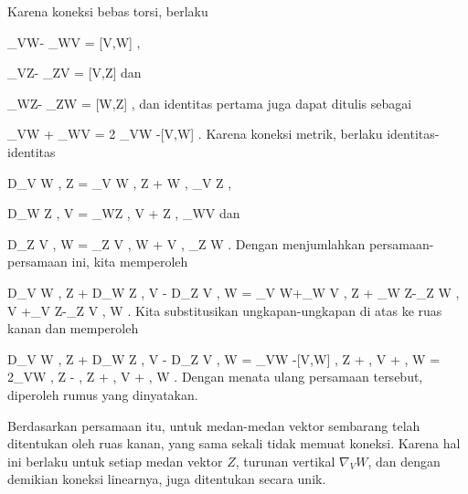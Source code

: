 {

Karena koneksi bebas torsi, berlaku

\mavergleichskettedisp
{\vergleichskette
{ \nabla_VW- \nabla_WV
}
{ =} { [V,W]
}
{ } {
}
{ } {
}
{ } {
}
}
{}{}{,}

\mavergleichskettedisp
{\vergleichskette
{ \nabla_VZ- \nabla_ZV
}
{ =} { [V,Z]
}
{ } {
}
{ } {
}
{ } {
}
}
{}{}{}
dan

\mavergleichskettedisp
{\vergleichskette
{ \nabla_WZ- \nabla_ZW
}
{ =} { [W,Z]
}
{ } {
}
{ } {
}
{ } {
}
}
{}{}{,}
dan identitas pertama juga dapat ditulis sebagai

\mavergleichskettedisp
{\vergleichskette
{ \nabla_VW + \nabla_WV
}
{ =} { 2 \nabla_VW -[V,W]
}
{ } {
}
{ } {
}
{ } {
}
}
{}{}{.}
Karena koneksi metrik, berlaku identitas-identitas

\mavergleichskettedisp
{\vergleichskette
{ D_V \left\langle  W  ,  Z  \right\rangle
}
{ =} { \left\langle \nabla_V W , Z  \right\rangle  + \left\langle  W  ,  \nabla_V Z  \right\rangle
}
{ } {
}
{ } {
}
{ } {
}
}
{}{}{,}

\mavergleichskettedisp
{\vergleichskette
{ D_W \left\langle  Z  ,  V  \right\rangle
}
{ =} { \left\langle \nabla_WZ , V  \right\rangle  + \left\langle  Z  ,  \nabla_WV  \right\rangle
}
{ } {
}
{ } {
}
{ } {
}
}
{}{}{}
dan

\mavergleichskettedisp
{\vergleichskette
{ D_Z \left\langle  V  ,  W  \right\rangle
}
{ =} { \left\langle \nabla_Z V , W  \right\rangle  + \left\langle  V  ,  \nabla_Z W   \right\rangle
}
{ } {
}
{ } {
}
{ } {
}
}
{}{}{.}
Dengan menjumlahkan persamaan-persamaan ini, kita memperoleh

\mavergleichskettedisphandlinks
{\vergleichskettedisphandlinks
{ D_V \left\langle  W  ,  Z  \right\rangle+ D_W \left\langle  Z  ,  V  \right\rangle  - D_Z \left\langle  V  ,  W  \right\rangle
}
{ =} { \left\langle \nabla_V W+\nabla_W V  ,  Z  \right\rangle + \left\langle \nabla_W Z-\nabla_Z W   ,  V  \right\rangle+\left\langle  \nabla_V Z-\nabla_Z V   ,  W  \right\rangle
}
{ } {
}
{ } {
}
{ } {
}
}
{}{}{.}
Kita substitusikan ungkapan-ungkapan di atas ke ruas kanan dan memperoleh

\mavergleichskettealignhandlinks
{\vergleichskettealignhandlinks
{ D_V \left\langle  W  ,  Z  \right\rangle+ D_W \left\langle  Z  ,  V  \right\rangle  - D_Z \left\langle  V  ,  W  \right\rangle
}
{ =} { \left{} \nabla_VW -[V,W]  ,  Z  \right\rangle + \left\langle  [W,Z]  ,  V  \right\rangle + \left\langle  [V,Z]   ,  W  \right\rangle
}
{ =} { 2\left\langle  \nabla_VW   ,  Z  \right\rangle - \left\langle  [V,W]  ,  Z  \right\rangle + \left\langle  [W,Z]  ,  V  \right\rangle + \left\langle  [V,Z]   ,  W  \right\rangle
}
{ } {
}
{ } {
}
}
{}
{}{.}
Dengan menata ulang persamaan tersebut, diperoleh rumus yang dinyatakan.

Berdasarkan persamaan itu,
 untuk medan-medan vektor sembarang telah ditentukan oleh ruas kanan, yang sama sekali tidak memuat koneksi. Karena hal ini berlaku untuk setiap medan vektor $Z$, turunan vertikal $\nabla_V W$, dan dengan demikian koneksi linearnya, juga ditentukan secara unik.

}

